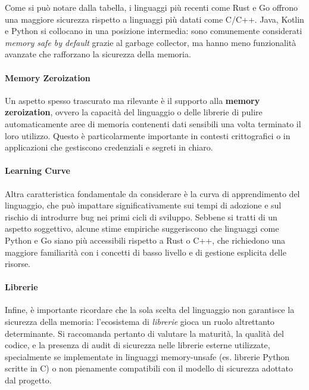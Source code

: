 
Come si può notare dalla tabella, i linguaggi più recenti come Rust e Go offrono
una maggiore sicurezza rispetto a linguaggi più datati come C/C++. Java, Kotlin e
Python si collocano in una posizione intermedia: sono comunemente considerati
\textit{memory safe by default} grazie al garbage collector, ma hanno meno
funzionalità avanzate che rafforzano la sicurezza della memoria.

\paragraph{Memory Zeroization}
Un aspetto spesso trascurato ma rilevante è il supporto alla \textbf{memory
zeroization}, ovvero la capacità del linguaggio o delle librerie di pulire automaticamente
aree di memoria contenenti dati sensibili una volta terminato il loro utilizzo.
Questo è particolarmente importante in contesti crittografici o in applicazioni
che gestiscono credenziali e segreti in chiaro.

\paragraph{Learning Curve}
Altra caratteristica fondamentale da considerare è la curva di apprendimento del
linguaggio, che può impattare significativamente sui tempi di adozione e sul
rischio di introdurre bug nei primi cicli di sviluppo. Sebbene si tratti di un aspetto
soggettivo, alcune stime empiriche\cite{learning_curves} suggeriscono che linguaggi
come Python e Go siano più accessibili rispetto a Rust o C++, che richiedono una
maggiore familiarità con i concetti di basso livello e di gestione esplicita
delle risorse.

\paragraph{Librerie}
Infine, è importante ricordare che la sola scelta del linguaggio non garantisce
la sicurezza della memoria: l'ecosistema di \textit{librerie} gioca un ruolo
altrettanto determinante. Si raccomanda pertanto di valutare la maturità, la
qualità del codice, e la presenza di audit di sicurezza nelle librerie esterne utilizzate,
specialmente se implementate in linguaggi memory-unsafe (es. librerie Python
scritte in C) o non pienamente compatibili con il modello di sicurezza adottato dal
progetto.

\newpage